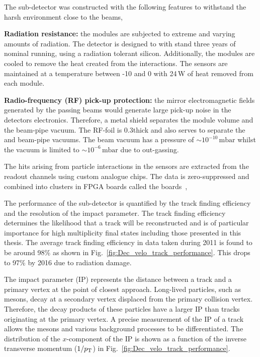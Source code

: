 The \velo sub-detector was constructed with the following features to withstand the harsh environment close to the \lhc beams,
\begin{description}   
\item \textbf{Radiation resistance:} the \velo modules are subjected to extreme and varying amounts of radiation. The detector is designed to with stand three years of nominal \lhc running, using a radiation tolerant silicon. Additionally, the \velo modules are cooled to remove the heat created from the interactions. The sensors are maintained at a temperature between -10 and 0 with 24\,W of heat removed from each module.  
\item \textbf{Radio-frequency (RF) pick-up protection:} the mirror electromagnetic fields generated by the passing \lhc beams would generate large pick-up noise in the \velo detectors electronics. Therefore, a metal shield separates the module volume and the beam-pipe vacuum. The RF-foil is 0.3\mm thick and also serves to separate the \velo and beam-pipe vacuums. The beam vacuum has a pressure of $\sim 10^{-10}\,\text{mbar}$ whilst the \velo vacuum is limited to $\sim 10^{-6}\,\text{mbar}$ due to out-gassing.

\end{description}   

The hits arising from particle interactions in the \velo sensors are extracted from the readout channels using custom analogue chips. The data is zero-suppressed and combined into clusters in FPGA boards called the \tellone boards~\cite{HAEFELI2006494}, 


The performance of the \velo sub-detector is quantified by the track finding efficiency and the resolution of the impact parameter. 
The track finding efficiency determines the likelihood that a track will be reconstructed and is of particular importance for high multiplicity final states including those presented in this thesis. The average track finding efficiency in data taken during 2011 is found to be around 98\% as shown in Fig.~\ref{fig:Dec_velo_track_performance}. This drops to 97\% by 2016 due to radiation damage.

The impact parameter (IP) represents the distance between a track and a primary vertex at the point of closest approach. Long-lived particles, such as \Bp mesons, decay at a secondary vertex displaced from the primary collision vertex. Therefore, the decay products of these particles have a larger IP than tracks originating at the primary vertex. A precise measurement of the IP of a track allows the \Bp mesons and various background processes to be differentiated. The distribution of the $x$-component of the IP is shown as a function of the inverse transverse momentum ($1/\mbox{$p_{\mathrm{ T}}$}$) in Fig.~\ref{fig:Dec_velo_track_performance}.  

